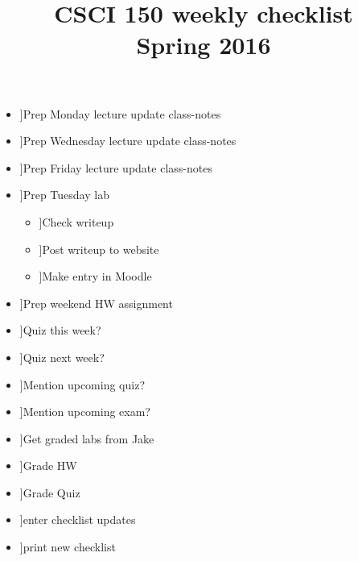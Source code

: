 \documentclass{article}
\title{CSCI 150 weekly checklist \\ {\small Spring 2016}}
\date{}
\newcommand{\cbox}{\framebox[1em]{\phantom{x}}}
\newcommand{\ci}{\item[\cbox]}
\newcommand{\also}{\cbox \hspace{1ex}}
\begin{document}
\maketitle
\thispagestyle{empty}

\begin{itemize}
\ci Prep Monday lecture \also update class-notes
\ci Prep Wednesday lecture \also update class-notes
\ci Prep Friday lecture \also update class-notes \\

\ci Prep Tuesday lab
\begin{itemize}
\ci Check writeup
\ci Post writeup to website
\ci Make entry in Moodle
\end{itemize}
\ci Prep weekend HW assignment \\

\ci Quiz this week?
\ci Quiz next week?
\ci Mention upcoming quiz?
\ci Mention upcoming exam? \\

\ci Get graded labs from Jake
\ci Grade HW
\ci Grade Quiz \\

\ci enter checklist updates
\ci print new checklist
\end{itemize}
\end{document}
